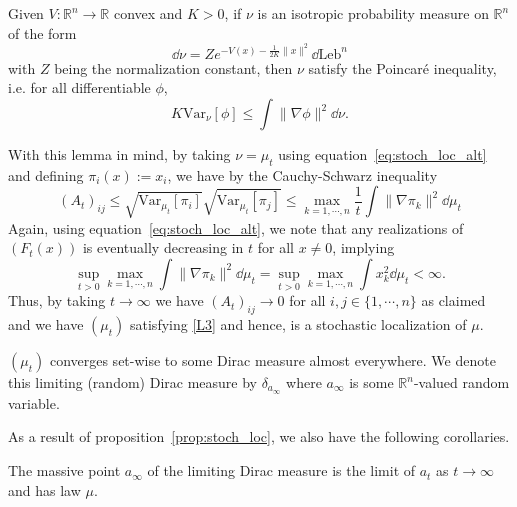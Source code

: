\begin{lemma}\label{lem:brascamp-lieb}
  Given \(V : \mathbb{R}^n \to \mathbb{R}\) convex and \(K > 0\), if \(\nu\) is an isotropic probability 
  measure on \(\mathbb{R}^n\) of the form 
  \[\dd \nu = Ze^{-V(x) - \frac{1}{2K}\|x\|^2}\dd \text{Leb}^n\]
  with \(Z\) being the normalization constant, then \(\nu\) satisfy the Poincaré inequality, i.e. 
  for all differentiable \(\phi\),
  \[K\text{Var}_\nu[\phi] \le \int \|\nabla\phi\|^2 \dd\nu.\]
\end{lemma}

With this lemma in mind, by taking \(\nu = \mu_t\) using 
equation~\eqref{eq:stoch_loc_alt} and defining
\(\pi_i(x) := x_i\), we have by the Cauchy-Schwarz inequality
\[(A_t)_{ij} \le \sqrt{\text{Var}_{\mu_t}[\pi_i]}\sqrt{\text{Var}_{\mu_t}[\pi_j]} 
  \le \max_{k = 1, \cdots, n} \frac{1}{t}\int \|\nabla \pi_k\|^2 \dd \mu_t\]
Again, using equation~\eqref{eq:stoch_loc_alt}, we note that any realizations of \((F_t(x))\) is eventually 
decreasing in \(t\) for all \(x \neq 0\), implying 
\[\sup_{t > 0} \max_{k = 1, \cdots, n} \int \|\nabla \pi_k\|^2 \dd \mu_t = 
\sup_{t > 0} \max_{k = 1, \cdots, n} \int x_k^2 \dd \mu_t < \infty.\] 
Thus, by taking \(t \to \infty\) we have \((A_t)_{ij} \to 0\) for all \(i, j \in \{1, \cdots, n\}\) as claimed 
and we have \((\mu_t)\) satisfying \ref{L3} and hence, is a stochastic localization of \(\mu\).

\begin{corollary}
  \((\mu_t)\) converges set-wise to some Dirac measure almost everywhere. We denote this 
  limiting (random) Dirac measure by \(\delta_{a_\infty}\) where \(a_\infty\) is some 
  \(\mathbb{R}^n\)-valued random variable.
\end{corollary}

As a result of proposition~\ref{prop:stoch_loc}, we also have the following corollaries.

\begin{corollary}\label{cor:lim_dis}
  The massive point \(a_\infty\) of the limiting Dirac measure is the limit of \(a_t\) as 
  \(t \to \infty\) and has law \(\mu\).
\end{corollary}

